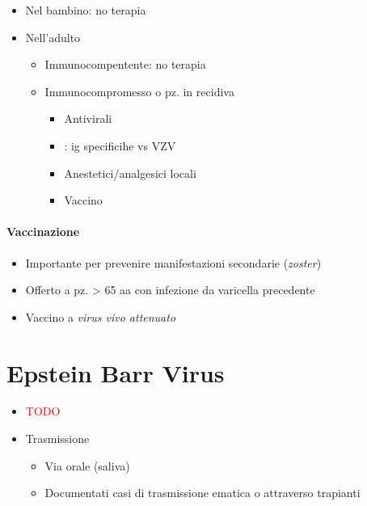 \documentclass[italian,]{article}
\providecommand{\tightlist}{%
  \setlength{\itemsep}{0pt}\setlength{\parskip}{0pt}}
\newcommand{\far}[1]{ \fbox{\textsc{#1}} } %
\newcommand{\TODO}[1]{\textcolor{red}{\textsf{\footnotesize{TODO #1}}}} %
\begin{document}
\begin{itemize}
\tightlist
\item
  Nel bambino: no terapia
\item
  Nell'adulto

  \begin{itemize}
  \tightlist
  \item
    Immunocompentente: no terapia
  \item
    Immunocompromesso o pz. in recidiva

    \begin{itemize}
    \tightlist
    \item
      Antivirali
    \item
      \far{vzig}: ig specificihe vs VZV
    \item
      Anestetici/analgesici locali
    \item
      Vaccino
    \end{itemize}
  \end{itemize}
\end{itemize}

\hypertarget{vaccinazione-2}{%
\paragraph{Vaccinazione}\label{vaccinazione-2}}

\begin{itemize}
\tightlist
\item
  Importante per prevenire manifestazioni secondarie (\emph{zoster})
\item
  Offerto a pz. \textgreater{} 65 aa con infezione da varicella
  precedente
\item
  Vaccino a \emph{virus vivo attenuato}
\end{itemize}

\hypertarget{epstein-barr-virus}{%
\section{Epstein Barr Virus}\label{epstein-barr-virus}}

\begin{itemize}
\item
  \TODO{}
\item
  Trasmissione

  \begin{itemize}
  \tightlist
  \item
    Via orale (saliva)
  \item
    Documentati casi di trasmissione ematica o attraverso trapianti
  \end{itemize}
\end{itemize}
\end{document}
